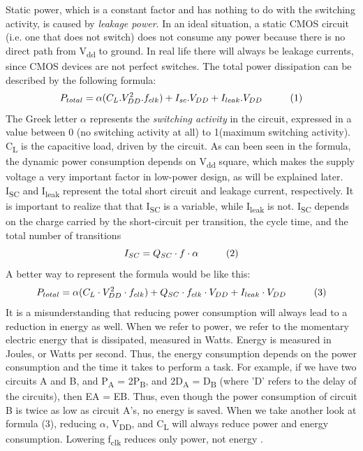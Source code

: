  \hspace{10mm}Static power, which is a constant factor and has nothing to do with the switching activity, is caused by \textit{leakage power}. In an ideal situation, a static CMOS circuit (i.e. one that does not switch) does not consume any power because there is no direct path from V\textsubscript{dd} to ground. In real life there will always be leakage currents, since CMOS devices are not perfect switches. The total power dissipation can be described by the following formula:
\[P_{total} = \alpha(C_L . V_{DD}^2.f_{clk}) + I_{sc}. V_{DD} + I_{leak} . V_{DD}    \hspace{10mm} (1) \]
\vspace*{-2mm}
 \hspace{10mm}The Greek letter $\alpha$ represents the \textit{switching activity} in the circuit, expressed in a value between 0 (no switching activity at all) to 1(maximum switching activity). C\textsubscript{L} is the capacitive load, driven by the circuit. As can been seen in the formula, the dynamic power consumption depends on V\textsubscript{dd} square, which makes the supply voltage a very important factor in low-power design, as will be explained later. I\textsubscript{SC} and I\textsubscript{leak} represent the total short circuit and leakage current, respectively. It is important to realize that that I\textsubscript{SC} is a variable, while I\textsubscript{leak} is not. I\textsubscript{SC} depends on the charge carried by the short-circuit per transition, the cycle time, and the total number of transitions
\vspace*{-2mm}
\[I_{SC} = Q_{SC}  \cdot  f \cdot \alpha    \hspace{10mm} (2) \] 
\vspace*{-2mm}
A better way to represent the formula would be like this:
\vspace*{-2mm}
\[P_{total} = \alpha(C_L \cdot V_{DD}^2 \cdot f_{clk}) +  Q_{SC}  \cdot  f_{clk} \cdot V_{DD} + I_{leak} \cdot V_{DD}    \hspace{10mm} (3) \]
 \hspace{10mm}It is a misunderstanding that reducing power consumption will always lead to a reduction in energy as well. When we refer to power, we refer to the momentary electric energy that is dissipated, measured in Watts. Energy is measured in Joules, or Watts per second. Thus, the energy consumption depends on the power consumption and the time it takes to perform a task. For example, if we have two circuits A and B, and P\textsubscript{A} = 2P\textsubscript{B}, and 2D\textsubscript{A} = D\textsubscript{B} (where ’D’ refers to the delay of the circuits), then EA = EB. Thus, even though the power consumption of circuit B is twice as low as circuit A’s, no energy is saved. When we take another look at formula (3), reducing $\alpha$, V\textsubscript{DD}, and C\textsubscript{L} will always reduce power and energy consumption. Lowering f\textsubscript{clk} reduces
only power, not energy \cite{PowerAwareArchitecting}.

